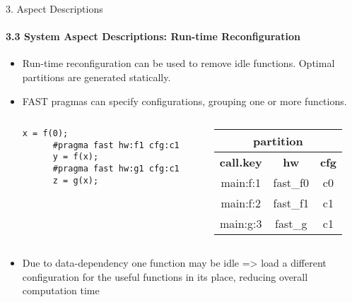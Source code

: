 \begin{frame}[fragile]{3. Aspect Descriptions}
  \framesubtitle{3.3 System Aspect Descriptions: Run-time Reconfiguration}
  \begin{itemize}
  \item Run-time reconfiguration can be used to remove idle
    functions. Optimal partitions are generated statically.
  \item FAST pragmas can specify configurations, grouping one
    or more functions.
    \begin{columns}
      \begin{column}{.55\textwidth}
        \begin{center}
    \begin{lstlisting}[style=MaxC]
      x = f(0);
      #pragma fast hw:f1 cfg:c1
      y = f(x);
      #pragma fast hw:g1 cfg:c1
      z = g(x);
    \end{lstlisting}
    \end{center}
    \end{column}
    \begin{column}{.45\textwidth}
      {\footnotesize
      \begin{table}[!h]
        \renewcommand{\arraystretch}{1.1}
      \hspace{-1cm}
        \begin{tabular}{c|c|c}
          \multicolumn{3}{c}{\bf{partition}} \\
          \hline
          \bf{call.key} & \bf{hw} & \bf{cfg}  \\
          \hline
          main:f:1 & fast\_f0 & c0 \\
          main:f:2 & fast\_f1 & c1 \\
          main:g:3 & fast\_g & c1 \\
        \end{tabular}
      \end{table}
    }
    \end{column}
    \end{columns}
  \item Due to data-dependency one function may be idle => load a
    different configuration for the useful functions in its place,
    reducing overall computation time
  \end{itemize}
\end{frame}

